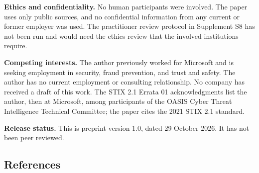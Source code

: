 \documentclass[
  11pt,
]{article}
\begin{document}
\textbf{Ethics and confidentiality.} No human participants were
involved. The paper uses only public sources, and no confidential
information from any current or former employer was used. The
practitioner review protocol in Supplement S8 has not been run and would
need the ethics review that the involved institutions require.

\textbf{Competing interests.} The author previously worked for Microsoft
and is seeking employment in security, fraud prevention, and trust and
safety. The author has no current employment or consulting relationship.
No company has received a draft of this work. The STIX 2.1 Errata 01
acknowledgments list the author, then at Microsoft, among participants
of the OASIS Cyber Threat Intelligence Technical Committee; the paper
cites the 2021 STIX 2.1 standard.

\textbf{Release status.} This is preprint version 1.0, dated 29 October
2026. It has not been peer reviewed.

\FloatBarrier

\hypertarget{references}{%
\subsection{References}\label{references}}

\suppressfloats[t]
\end{document}
